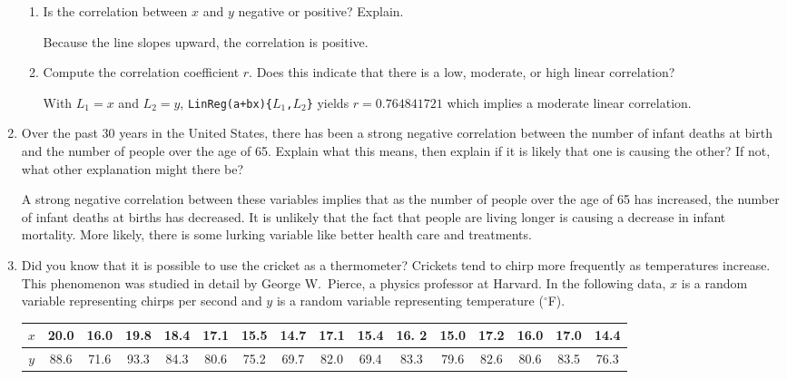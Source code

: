 \documentclass{article}
\begin{document}
\begin{enumerate}
\begin{enumerate}
	\item Is the correlation between $x$ and $y$ negative or positive?  Explain.
	
	{\answer  Because the line slopes upward, the correlation is positive.} 
	
	\vfill
	
	\item Compute the correlation coefficient $r$.  Does this indicate that there is a low, moderate, or high linear correlation?
	
	{\answer With $L_1 = x$ and $L_2 = y$, \texttt{LinReg(a+bx)\{$L_1$,$L_2$\}}  yields $r=0.764841721$ which implies a moderate linear correlation.} 
	
	\vfill
	
	\end{enumerate}

\pagebreak

\item Over the past 30 years in the United States, there has been a strong negative correlation between the number of infant deaths at birth and the number of people over the age of 65.  Explain what this means, then explain if
it is likely that one is causing the other?  If not, what other explanation might there be?

{\answer A strong negative correlation between these variables implies that as the number of people over the age of 65 has increased, the number of infant deaths at births has decreased.  It is unlikely that the fact that people are living longer is causing a decrease in infant mortality.  More likely, there is some lurking variable like better health care and treatments.
}
\vfill

\item Did you know that it is possible to use the cricket as a thermometer?  Crickets tend to chirp more frequently as temperatures increase.  This phenomenon was studied in detail by George W.\ Pierce, a physics professor at Harvard.  In the following data, $x$ is a random variable representing chirps per second and $y$ is a random variable representing temperature ($^\circ$F). 

\begin{center}
\begin{tabular}{c||ccccccccccccccc}
\hline
$x$ & 20.0 & 16.0 & 19.8 & 18.4 & 17.1 & 15.5 & 14.7 & 17.1 & 15.4 & 16. 2 & 15.0 & 17.2 & 16.0 & 17.0 & 14.4 \\
\hline
$y$ & 88.6 & 71.6 & 93.3 & 84.3 & 80.6 & 75.2 & 69.7 & 82.0 & 69.4 & 83.3 & 79.6 & 82.6 & 80.6 & 83.5 & 76.3 \\ 
\hline
\end{tabular}
\end{center}


\end{enumerate}
\end{document}
